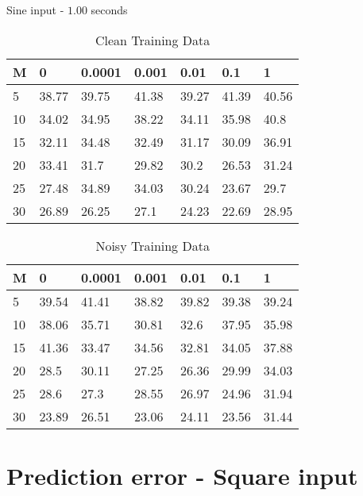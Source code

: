\documentclass{beamer}
\begin{document}
\begin{frame}{Sine input - $1.00$ seconds}
    \scriptsize
    \begin{table}[!ht]
        \centering
        \begin{tabular}{|l|l|l|l|l|l|l|}
        \hline
            M & 0 & 0.0001 & 0.001 & 0.01 & 0.1 & 1 \\ \hline
            5 & 38.77 & 39.75 & 41.38 & 39.27 & 41.39 & 40.56 \\ \hline
            10 & 34.02 & 34.95 & 38.22 & 34.11 & 35.98 & 40.8 \\ \hline
            15 & 32.11 & 34.48 & 32.49 & 31.17 & 30.09 & 36.91 \\ \hline
            20 & 33.41 & 31.7 & 29.82 & 30.2 & 26.53 & 31.24 \\ \hline
            25 & 27.48 & 34.89 & 34.03 & 30.24 & 23.67 & 29.7 \\ \hline
            30 & 26.89 & 26.25 & 27.1 & 24.23 & 22.69 & 28.95 \\ \hline
        \end{tabular}
        \caption{Clean Training Data}
    \end{table}

    \begin{table}[!ht]
        \centering
        \begin{tabular}{|l|l|l|l|l|l|l|}
        \hline
            M & 0 & 0.0001 & 0.001 & 0.01 & 0.1 & 1 \\ \hline
            5 & 39.54 & 41.41 & 38.82 & 39.82 & 39.38 & 39.24 \\ \hline
            10 & 38.06 & 35.71 & 30.81 & 32.6 & 37.95 & 35.98 \\ \hline
            15 & 41.36 & 33.47 & 34.56 & 32.81 & 34.05 & 37.88 \\ \hline
            20 & 28.5 & 30.11 & 27.25 & 26.36 & 29.99 & 34.03 \\ \hline
            25 & 28.6 & 27.3 & 28.55 & 26.97 & 24.96 & 31.94 \\ \hline
            30 & 23.89 & 26.51 & 23.06 & 24.11 & 23.56 & 31.44 \\ \hline
        \end{tabular}
        \caption{Noisy Training Data}
    \end{table}
\end{frame}


\section{Prediction error - Square input}
\end{document}
